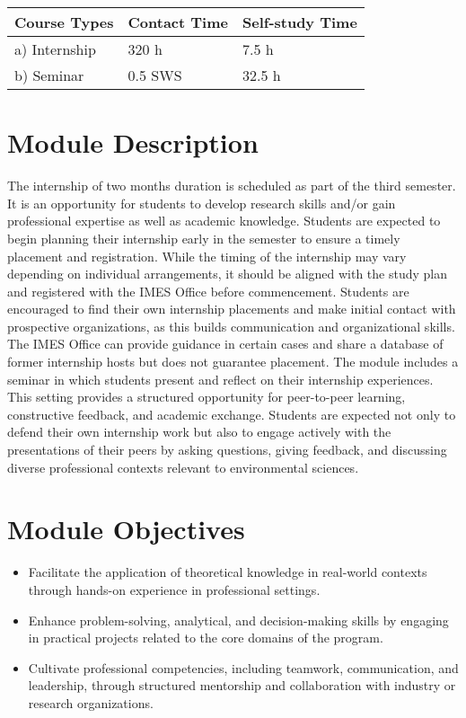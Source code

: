 \documentclass[
  letterpaper,
  10pt,
  openany]{book}
\providecommand{\tightlist}{%
  \setlength{\itemsep}{0pt}\setlength{\parskip}{0pt}}\usepackage{longtable,booktabs,array}
\begin{document}
\begin{longtable}[]{@{}lll@{}}
\toprule\noalign{}
Course Types & Contact Time & Self-study Time \\
\midrule\noalign{}
\endhead
\bottomrule\noalign{}
\endlastfoot
a) Internship & 320 h & 7.5 h \\
b) Seminar & 0.5 SWS & 32.5 h \\
\end{longtable}

\section*{Module Description}\label{module-description-4}


The internship of two months duration is scheduled as part of the third
semester. It is an opportunity for students to develop research skills
and/or gain professional expertise as well as academic knowledge.
Students are expected to begin planning their internship early in the
semester to ensure a timely placement and registration. While the timing
of the internship may vary depending on individual arrangements, it
should be aligned with the study plan and registered with the IMES
Office before commencement. Students are encouraged to find their own
internship placements and make initial contact with prospective
organizations, as this builds communication and organizational skills.
The IMES Office can provide guidance in certain cases and share a
database of former internship hosts but does not guarantee placement.
The module includes a seminar in which students present and reflect on
their internship experiences. This setting provides a structured
opportunity for peer-to-peer learning, constructive feedback, and
academic exchange. Students are expected not only to defend their own
internship work but also to engage actively with the presentations of
their peers by asking questions, giving feedback, and discussing diverse
professional contexts relevant to environmental sciences.

\section*{Module Objectives}\label{module-objectives-3}


\begin{itemize}
\tightlist
\item
  Facilitate the application of theoretical knowledge in real-world
  contexts through hands-on experience in professional settings.
\item
  Enhance problem-solving, analytical, and decision-making skills by
  engaging in practical projects related to the core domains of the
  program.
\item
  Cultivate professional competencies, including teamwork,
  communication, and leadership, through structured mentorship and
  collaboration with industry or research organizations.
\end{itemize}
\end{document}
